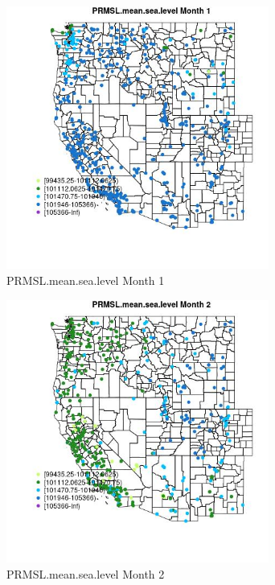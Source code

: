 \begin{figure} 
\centering  
\includegraphics[width=0.77\textwidth]{Code_Outputs/Report_ML_input_PM25_Step4_part_e_de_duplicated_aves_compiled_2019-05-18wNAs_MapObsMo1PRMSLmeansealevel.jpg} 
\caption{\label{fig:Report_ML_input_PM25_Step4_part_e_de_duplicated_aves_compiled_2019-05-18wNAsMapObsMo1PRMSLmeansealevel}PRMSL.mean.sea.level Month 1} 
\end{figure} 
 

\begin{figure} 
\centering  
\includegraphics[width=0.77\textwidth]{Code_Outputs/Report_ML_input_PM25_Step4_part_e_de_duplicated_aves_compiled_2019-05-18wNAs_MapObsMo2PRMSLmeansealevel.jpg} 
\caption{\label{fig:Report_ML_input_PM25_Step4_part_e_de_duplicated_aves_compiled_2019-05-18wNAsMapObsMo2PRMSLmeansealevel}PRMSL.mean.sea.level Month 2} 
\end{figure} 
 

